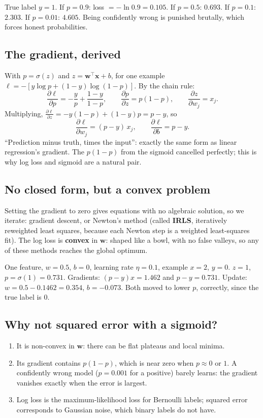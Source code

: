 \begin{example}
True label $y=1$. If $p = 0.9$: loss $= -\ln 0.9 = 0.105$. If $p = 0.5$: $0.693$. If $p = 0.1$: $2.303$.
If $p = 0.01$: $4.605$. Being confidently wrong is punished brutally, which forces honest probabilities.
\end{example}

\subsection{The gradient, derived}
With $p = \sigma(z)$ and $z = \mathbf w^\top\mathbf x + b$, for one example
$\ell = -[y\log p + (1-y)\log(1-p)]$. By the chain rule:
\[ \frac{\partial\ell}{\partial p} = -\frac{y}{p} + \frac{1-y}{1-p},\qquad \frac{\partial p}{\partial z} = p(1-p),\qquad
\frac{\partial z}{\partial w_j} = x_j. \]
Multiplying, $\frac{\partial\ell}{\partial z} = -y(1-p) + (1-y)p = p - y$, so
\[ \boxed{\frac{\partial\ell}{\partial w_j} = (p - y)\,x_j,\qquad \frac{\partial\ell}{\partial b} = p - y.} \]
``Prediction minus truth, times the input'': exactly the same form as linear regression's gradient. The $p(1-p)$
from the sigmoid cancelled perfectly; this is why log loss and sigmoid are a natural pair.

\subsection{No closed form, but a convex problem}
Setting the gradient to zero gives equations with no algebraic solution, so we iterate: gradient descent, or
Newton's method (called \textbf{IRLS}, iteratively reweighted least squares, because each Newton step is a
weighted least-squares fit). The log loss is \textbf{convex} in $\mathbf w$: shaped like a bowl, with no false
valleys, so any of these methods reaches the global optimum.

\begin{example}
One feature, $w=0.5$, $b=0$, learning rate $\eta = 0.1$, example $x = 2$, $y = 0$.
$z = 1$, $p = \sigma(1) = 0.731$. Gradients: $(p-y)x = 1.462$ and $p - y = 0.731$.
Update: $w = 0.5 - 0.1462 = 0.354$, $b = -0.073$. Both moved to lower $p$, correctly, since the true label is 0.
\end{example}

\subsection{Why not squared error with a sigmoid?}
\begin{enumerate}
\item It is non-convex in $\mathbf w$: there can be flat plateaus and local minima.
\item Its gradient contains $p(1-p)$, which is near zero when $p\approx0$ or $1$. A confidently wrong model
  ($p=0.001$ for a positive) barely learns: the gradient vanishes exactly when the error is largest.
\item Log loss is the maximum-likelihood loss for Bernoulli labels; squared error corresponds to Gaussian noise,
  which binary labels do not have.
\end{enumerate}

